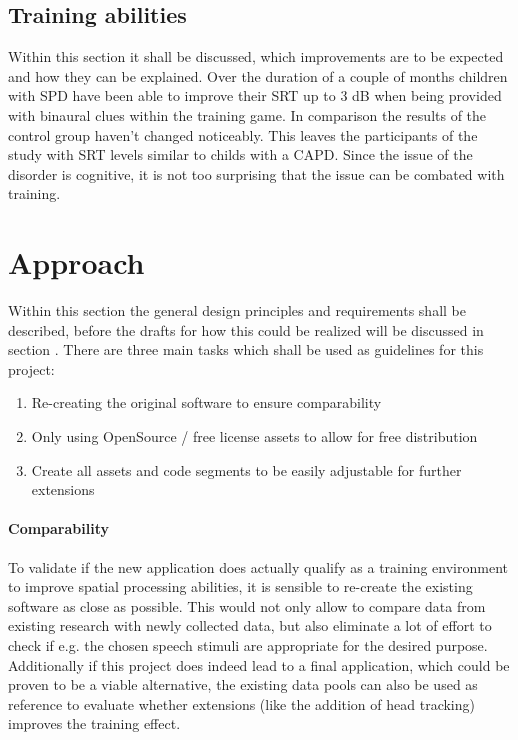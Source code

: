 \documentclass[a4paper,11pt]{article}%
\renewcommand{\\}{\vspace*{0.5\baselineskip} \newline}
\begin{document}
\subsection{Training abilities}
Within this section it shall be discussed, which improvements are to be expected and how they can be explained.
\newline
\newline
Over the duration of a couple of months children with \ac{SPD} have been able to improve their \ac{SRT} up to 3 dB when being provided with binaural clues within the training game. In comparison the results of the control group haven't changed noticeably. This leaves the participants of the study with \ac{SRT} levels similar to childs with a \ac{CAPD}.
\newline
\newline
Since the issue of the disorder is cognitive, it is not too surprising that the issue can be combated with training.


\section{Approach}
\label{sec:approach}
Within this section the general design principles and requirements shall be described, before the drafts for how this could be realized will be discussed in section .
\newline
\newline
There are three main tasks which shall be used as guidelines for this project:
\begin{enumerate}
\item Re-creating the original software to ensure comparability
\item Only using OpenSource / free license assets to allow for free distribution
\item Create all assets and code segments to be easily adjustable for further extensions
\end{enumerate}


\paragraph{Comparability} To validate if the new application does actually qualify as a training environment to improve spatial processing abilities, it is sensible to re-create the existing software as close as possible. This would not only allow to compare data from existing research with newly collected data, but also eliminate a lot of effort to check if e.g. the chosen speech stimuli are appropriate for the desired purpose. Additionally if this project does indeed lead to a final application, which could be proven to be a viable alternative, the existing data pools can also be used as reference to evaluate whether extensions (like the addition of head tracking) improves the training effect.
\end{document}
